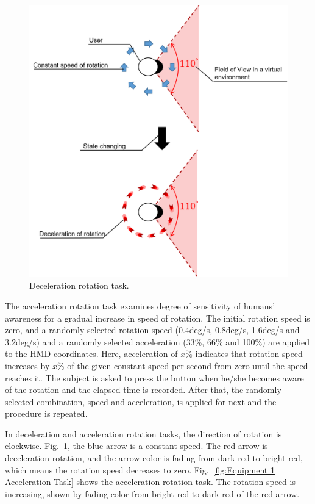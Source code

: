 \begin{figure}[H]\centering
	\includegraphics[width=1.0\textwidth]{Pictures/Deceleration Task.png}%
	\caption{Deceleration rotation task.}\label{fig:Equipment 1 Deceleration Task}%
\end{figure}

\newpage
The acceleration rotation task examines degree of sensitivity of humans' awareness for a gradual increase in speed of rotation.
The initial rotation speed is zero, and a randomly selected rotation speed (0.4deg/s, 0.8deg/s, 1.6deg/s and 3.2deg/s) and a randomly selected acceleration (33\%, 66\% and 100\%) are applied to the HMD coordinates. Here, acceleration of $x$\% indicates that rotation speed increases by $x$\% of the given constant speed per second from zero until the speed reaches it. The subject is asked to press the button when he/she becomes aware of the rotation and the elapsed time is recorded. After that, the randomly selected combination, speed and acceleration, is applied for next and the procedure is repeated.

In deceleration and acceleration rotation tasks, the direction of rotation is clockwise. Fig.~\ref{fig:Equipment 1 Deceleration Task}, the blue arrow is a constant speed. The red arrow is deceleration rotation, and the arrow color is fading from dark red to bright red, which means the rotation speed decreases to zero. Fig.~\ref{fig:Equipment 1 Acceleration Task} shows the acceleration rotation task. The rotation speed is increasing, shown by fading color from bright red to dark red of the red arrow.

